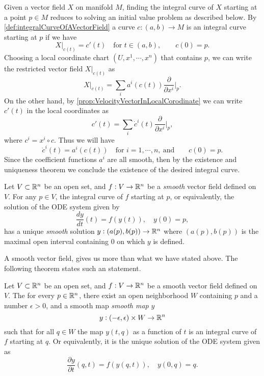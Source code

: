 Given a vector field $ X $ on manifold $ M $, finding the integral curve of $ X $ starting at a point $ p \in M $ reduces to solving an initial value problem as described below. By \autoref{def:integralCurveOfAVectorField} a curve $ c:(a,b) \to M $ is an integral curve starting at $ p $ if we have
\[ X|_{c(t)} = c'(t) \quad \text{for } t\in (a,b),\qquad c(0) = p.   \]
Choosing a local coordinate chart $ (U,x^1,\cdots,x^n) $ that contains $ p $, we can write the restricted vector field $ X|_{c(t)} $ as
\[ X|_{c(t)} = \sum_i a^i(c(t)) \frac{\partial}{\partial x^i}\big|_{p}.  \]
On the other hand, by \autoref{prop:VelocityVectorInLocalCorodinate} we can write $ c'(t) $ in the local coordinates as
\[ c'(t) = \sum_i \dot{c}^i(t) \frac{\partial }{\partial x^i}\big|_{p},    \]
where $ c^i = x^i \circ c $.
Thus we will have
\[ \dot{c}^i(t) = a^i(c(t)) \quad \text{for } i=1,\cdots,n,\ \text{and} \qquad c(0) = p.\]
Since the coefficient functions $ a^i $ are all smooth, then by the existence and uniqueness theorem we conclude the existence of the desired integral curve. 

\begin{theorem}
	\label{thm:existenceUniqTheoremODE}
	Let $ V \subset \mathbb{R}^n $ be an open set, and $ f: V\to \mathbb{R}^n $ be a \emph{smooth} vector field defined on $ V $. For any $ p \in V $,  the integral curve of $ f $ starting at $ p $, or equivalently, the solution of the ODE system given by
	\[ \frac{d y }{dt}(t) = f(y(t)), \quad y(0) = p, \]
	has a unique \emph{smooth} solution $ y:(a(p),b(p)) \to \mathbb{R}^n $ where $ (a(p),b(p)) $ is the maximal open interval containing $ 0 $ on which $ y $ is defined. 
\end{theorem}

A smooth vector field, gives us more than what we have stated above. The following theorem states such an statement.

\begin{theorem}
	Let $ V\subset \mathbb{R}^n $ be an open set, and $ f:V\to \mathbb{R}^n $ be a smooth vector field defined on $ V $. The for every $ p \in \mathbb{R}^n $, there exist an open neighborhood $ W $ containing $ p $ and a number $ \epsilon>0 $, and a smooth map \emph{smooth map} $ y $
	\[ y: (-\epsilon,\epsilon) \times W \to \mathbb{R}^n \]
	such that for all $ q \in W $ the map $ y(t,q) $ as a function of $ t $ is an integral curve of $ f $ starting at $ q $. Or equivalently, it is the unique solution of the ODE system given as
	\[ \frac{\partial y}{\partial t}(q,t) = f(y(q,t)), \quad y(0,q) = q.\]
\end{theorem}

